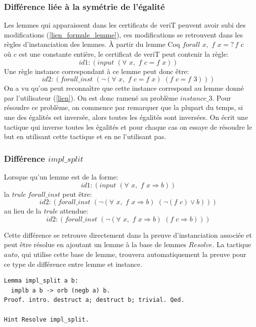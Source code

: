 \documentclass[11pt]{article}
\begin{document}
\subsubsection{Différence liée à la symétrie de l'égalité}

Les lemmes qui apparaissent dans les certificats de veriT peuvent avoir subi des modifications (\ref{lien_formule_lemme}), ces modifications se retrouvent dans les règles d'instanciation des lemmes. À partir du lemme Coq $forall\,\, x, \,\,f \,\,x =? \, f \,\,c$ où $c$ est une constante entière, le certificat de veriT peut contenir la règle:
\[id1: (input \,\,(\forall\,\, x, \,\,f \,\,c = f \,\,x))\]
Une règle instance correspondant à ce lemme peut donc être: 
\[id2:(forall\_inst\,\, (\neg (\forall \,\,x,\,\, f\,\, c = f \,\,x) \,\, (f\,\, c = f\,\, 3)))\]
On a vu qu'on peut reconnaître que cette instance correspond au lemme donné par l'utilisateur (\ref{lien}). On est donc ramené au problème $instance\_3$. Pour résoudre ce problème, on commence par remarquer que la plupart du temps, si une des égalités est inversée, alors toutes les égalités sont inversées. On écrit une tactique qui inverse toutes les égalités et pour chaque cas on essaye de résoudre le but en utilisant cette tactique et en ne l'utilisant pas.

\subsubsection{Différence $impl\_split$}

Lorsque qu'un lemme est de la forme:
\[ id1:(input \,\,(\forall\,\, x,\,\, f \,\,x \Rightarrow b)) \]
la \textit{trule} $forall\_inst$ peut être:
\[ id2:(forall\_inst \,\, ( \neg (\forall\,\, x, \,\,f \,\, x \Rightarrow b) \,\,(\neg (f\,\, c) \vee  b))) \]
au lieu de la \textit{trule} attendue:
\[ id2:(forall\_inst  \,\,( \neg (\forall \,\,x,\,\, f\,\, x \Rightarrow b)\,\, (f \,\,c \Rightarrow b))) \]

Cette différence se retrouve directement dans la preuve d'instanciation associée et peut être résolue en ajoutant un lemme à la base de lemmes $Resolve$. La tactique $auto$, qui utilise cette base de lemme, trouvera automatiquement la preuve pour ce type de différence entre lemme et instance.

\begin{lstlisting}[frame=single]
Lemma impl_split a b:
  implb a b -> orb (negb a) b.
Proof. intro. destruct a; destruct b; trivial. Qed.

Hint Resolve impl_split.
\end{lstlisting}
\end{document}
